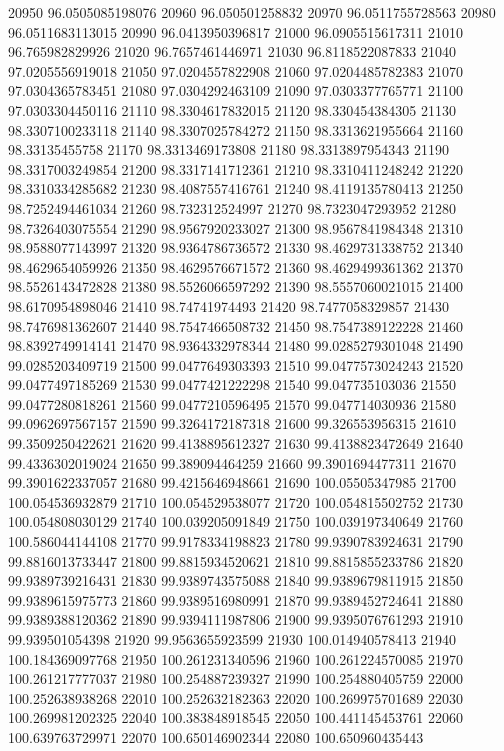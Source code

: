 {20950 96.0505085198076
20960 96.050501258832
20970 96.0511755728563
20980 96.0511683113015
20990 96.0413950396817
21000 96.0905515617311
21010 96.765982829926
21020 96.7657461446971
21030 96.8118522087833
21040 97.0205556919018
21050 97.0204557822908
21060 97.0204485782383
21070 97.0304365783451
21080 97.0304292463109
21090 97.0303377765771
21100 97.0303304450116
21110 98.3304617832015
21120 98.330454384305
21130 98.3307100233118
21140 98.3307025784272
21150 98.3313621955664
21160 98.33135455758
21170 98.3313469173808
21180 98.3313897954343
21190 98.3317003249854
21200 98.3317141712361
21210 98.3310411248242
21220 98.3310334285682
21230 98.4087557416761
21240 98.4119135780413
21250 98.7252494461034
21260 98.732312524997
21270 98.7323047293952
21280 98.7326403075554
21290 98.9567920233027
21300 98.9567841984348
21310 98.9588077143997
21320 98.9364786736572
21330 98.4629731338752
21340 98.4629654059926
21350 98.4629576671572
21360 98.4629499361362
21370 98.5526143472828
21380 98.5526066597292
21390 98.5557060021015
21400 98.6170954898046
21410 98.74741974493
21420 98.7477058329857
21430 98.7476981362607
21440 98.7547466508732
21450 98.7547389122228
21460 98.8392749914141
21470 98.9364332978344
21480 99.0285279301048
21490 99.0285203409719
21500 99.0477649303393
21510 99.0477573024243
21520 99.0477497185269
21530 99.0477421222298
21540 99.047735103036
21550 99.0477280818261
21560 99.0477210596495
21570 99.047714030936
21580 99.0962697567157
21590 99.3264172187318
21600 99.326553956315
21610 99.3509250422621
21620 99.4138895612327
21630 99.4138823472649
21640 99.4336302019024
21650 99.389094464259
21660 99.3901694477311
21670 99.3901622337057
21680 99.4215646948661
21690 100.05505347985
21700 100.054536932879
21710 100.054529538077
21720 100.054815502752
21730 100.054808030129
21740 100.039205091849
21750 100.039197340649
21760 100.586044144108
21770 99.9178334198823
21780 99.9390783924631
21790 99.8816013733447
21800 99.8815934520621
21810 99.8815855233786
21820 99.9389739216431
21830 99.9389743575088
21840 99.9389679811915
21850 99.9389615975773
21860 99.9389516980991
21870 99.9389452724641
21880 99.9389388120362
21890 99.9394111987806
21900 99.9395076761293
21910 99.939501054398
21920 99.9563655923599
21930 100.014940578413
21940 100.184369097768
21950 100.261231340596
21960 100.261224570085
21970 100.261217777037
21980 100.254887239327
21990 100.254880405759
22000 100.252638938268
22010 100.252632182363
22020 100.269975701689
22030 100.269981202325
22040 100.383848918545
22050 100.441145453761
22060 100.639763729971
22070 100.650146902344
22080 100.650960435443
}
